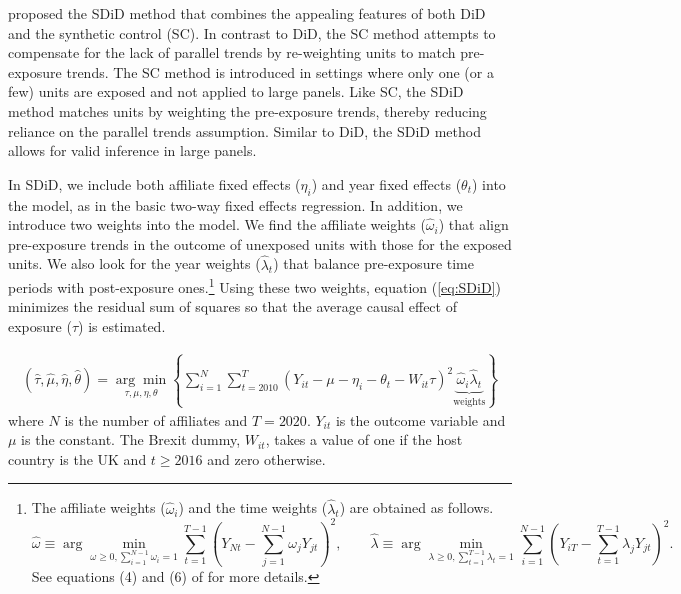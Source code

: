 \documentclass[preprint,11pt,authoryear]{elsarticle}
\begin{document}
\cite{arkhangelsky2021synthetic} proposed the SDiD method that combines the appealing features of both DiD and the synthetic control (SC). 
In contrast to DiD, the SC method attempts to compensate for the lack of parallel trends by re-weighting units to match pre-exposure trends.
The SC method is introduced in settings where only one (or a few) units are exposed and not applied to large panels.
Like SC, the SDiD method matches units by weighting the pre-exposure trends, thereby reducing reliance on the parallel trends assumption. 
Similar to DiD, the SDiD method allows for valid inference in large panels.


In SDiD, we include both affiliate fixed effects ($\eta_{i}$) and year fixed effects ($\theta_{t}$) into the model, as in the basic two-way fixed effects regression.
In addition, we introduce two weights into the model. 
We find the affiliate weights ($\hat{\omega}_{i}$) that align pre-exposure trends in the outcome of unexposed units with those for the exposed units.
We also look for the year weights ($\hat{\lambda}_{t}$) that balance pre-exposure time periods with post-exposure ones.\footnote{
The affiliate weights ($\hat{\omega}_{i}$) and the time weights ($\hat{\lambda}_{t}$) are obtained as follows.
\begin{equation}
\hat{\omega} \equiv\arg \min _{\omega \geq 0, \sum_{i=1}^{N-1} \omega_{i}=1} \sum_{t=1}^{T-1}\left(Y_{N t}-\sum_{j=1}^{N-1} \omega_{j} Y_{j t}\right)^{2},
\qquad
\hat{\lambda} \equiv \arg \min _{\lambda \geq 0, \sum_{t=1}^{T-1} \lambda_{t}=1} \sum_{i=1}^{N-1}\left(Y_{i T}-\sum_{t=1}^{T-1} \lambda_{j} Y_{j t}\right)^{2}.
\end{equation}
See equations (4) and (6) of \cite{arkhangelsky2021synthetic} for more details.
}
Using these two weights, equation (\ref{eq:SDiD}) minimizes the residual sum of squares so that the average causal effect of exposure ($\tau$) is estimated.


\begin{align} \label{eq:SDiD}
\left(\hat{\tau}, \hat{\mu}, \hat{\eta}, \hat{\theta}\right)
=
\underset{\tau, \mu, \eta, \theta}{\arg \min }
\left\{\sum_{i=1}^{N} \sum_{t=2010}^{T}
\left(Y_{i t}-\mu-\eta_{i}-\theta_{t}
-W_{i t} \tau \right)^{2}
\underbrace{\hat{\omega}_{i} \hat{\lambda}_{t}}_{\text{weights}}
\right\}
\end{align}
where $N$ is the number of affiliates and $T=2020$. $Y_{it}$ is the outcome variable and $\mu$ is the constant.
The Brexit dummy, $W_{it}$, takes a value of one if the host country is the UK and $t \geq 2016$ and zero otherwise.
\end{document}
